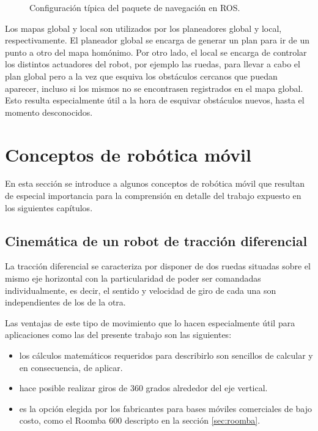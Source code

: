 \begin{figure}[ht]
    \centering
    \def\svgwidth{350pt}
    
    \caption{Configuración típica del paquete de navegación en ROS.}
    \label{fig:navigationStack}
\end{figure}

Los mapas global y local son utilizados por los planeadores global y local, respectivamente. El planeador global se encarga de generar un plan para ir de un punto a otro del mapa homónimo. Por otro lado, el local se encarga de controlar los distintos actuadores del robot, por ejemplo las ruedas, para llevar a cabo el plan global pero a la vez que esquiva los obstáculos cercanos que puedan aparecer, incluso si los mismos no se encontrasen registrados en el mapa global. Esto resulta especialmente útil a la hora de esquivar obstáculos nuevos, hasta el momento desconocidos.

\section{Conceptos de robótica móvil}

En esta sección se introduce a algunos conceptos de robótica móvil que resultan de especial importancia para la comprensión en detalle del trabajo expuesto en los siguientes capítulos.

\subsection{Cinemática de un robot de tracción diferencial}

La tracción diferencial se caracteriza por disponer de dos ruedas situadas sobre el mismo eje horizontal con la particularidad de poder ser comandadas individualmente, es decir, el sentido y velocidad de giro de cada una son independientes de los de la otra.

Las ventajas de este tipo de movimiento que lo hacen especialmente útil para aplicaciones como las del presente trabajo son las siguientes:

\begin{itemize}
    \item los cálculos matemáticos requeridos para describirlo son sencillos de calcular y en consecuencia, de aplicar.
    \item hace posible realizar giros de 360 grados alrededor del eje vertical.
    \item es la opción elegida por los fabricantes para bases móviles comerciales de bajo costo, como el Roomba 600 descripto en la sección \ref{sec:roomba}.
\end{itemize}

